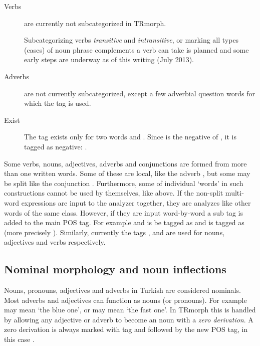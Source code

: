 \documentclass[twocolumn]{article}
\begin{document}
\begin{description}
\item[Verbs] are currently not subcategorized in TRmorph. 

Subcategorizing verbs \emph{transitive} and \emph{intransitive}, or
marking all types (cases) of noun phrase complements a verb can take
is planned and some early steps are underway as of this writing (July
2013).
\item[Adverbs] are not currently subcategorized, except a few adverbial
question words for which the tag  is used.

\item[Exist] The tag  exists only for two words
 and  . 
Since  is the negative of , it is tagged as
negative: .
\end{description}

Some verbs, nouns, adjectives, adverbs and conjunctions are formed
from more than one written words. Some of these are local, like the
adverb , but some may be split like the
conjunction  . Furthermore, some of individual `words' in
such constructions cannot be used by themselves, like 
above. If the non-split multi-word expressions are input to the
analyzer together, they are analyzes like other words of the same
class. However, if they are input word-by-word a sub tag
 is added to the main POS tag. For example
 and  is be tagged as 
and  is tagged as  (more precisely
). Similarly, currently the tags 
, 
 and
 are used for nouns, adjectives and verbs
respectively.

\subsection{Nominal morphology and noun inflections}

Nouns, pronouns, adjectives and adverbs in Turkish are considered
nominals. Most adverbs and adjectives can function as nouns (or
pronouns). For example  may mean `the blue one', or
 may mean `the fast one'. In TRmorph this is
handled by allowing any adjective or adverb to become an noun with a
\emph{zero derivation}. A zero derivation is always marked with tag
 and followed by the new POS tag, in this case . 
\end{document}
